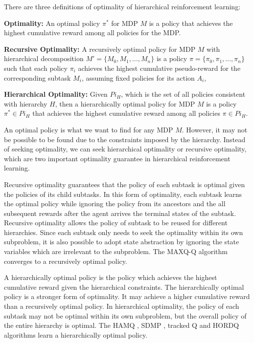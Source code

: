 There are three definitions of optimality of hierarchical reinforcement learning:

\begin{definition}
    \textbf{Optimality:} An optimal policy $\pi^*$ for MDP $M$ is a policy that achieves the highest cumulative reward
    among all policies for the MDP.
\end{definition}
\begin{definition}
    \textbf{Recursive Optimality:} A recursively optimal policy for MDP $M$ with hierarchical 
    decomposition $M' = \{M_0, M_1, \dots, M_n\}$ is a policy $\pi = \{\pi_0, \pi_1, \dots, \pi_n\}$ such
    that each policy $\pi_i$ achieves the highest cumulative pseudo-reward for the corresponding subtask $M_i$,
    assuming fixed policies for its action $A_i$, 
\end{definition}
\begin{definition}
    \textbf{Hierarchical Optimality:} Given $Pi_H$, which is the set of all policies consistent with hierarchy $H$, 
    then a hierarchically optimal policy for MDP $M$ is a policy $\pi^* \in Pi_H$ that achieves the highest cumulative reward
    among all policies $\pi \in Pi_H$.
\end{definition}

An optimal policy is what we want to find for any MDP $M$. However, it may not be possible to 
be found due to the constraints imposed by the hierarchy. Instead of seeking optimality, 
we can seek hierarchical optimality or recursive optimality, which are two important 
optimality guarantee in hierarchical reinforcement learning.

Recursive optimality guarantees that the policy of each subtask is optimal given the policies of its child subtasks.
In this form of optimality, each subtask learns the optimal policy while ignoring the policy from its ancestors
and the all subsequent rewards after the agent arrives the terminal states of the subtask.
Recursive optimality allows the policy of subtask to be reused for different hierarchies. Since
each subtask only needs to seek the optimality within its own subproblem, it is also possible
to adopt state abstraction by ignoring the state variables which are irrelevant
to the subproblem. The MAXQ-Q \cite{MaxQJ} algorithm converges to a recursively optimal policy. 

A hierarchically optimal policy is the policy which achieves the highest cumulative reward given the
hierarchical constraints. The hierarchically optimal policy is a stronger form of optimality. It
may achieve a higher cumulative reward than a recursively optimal policy. In hierarchical optimality, 
the policy of each subtask may not be optimal within its own subproblem, but the overall policy 
of the entire hierarchy is optimal. The HAMQ \cite{HAMQ}, SDMP \cite{SMDP}, tracked Q and HORDQ \cite{HORDQ} algorithms learn
a hierarchically optimal policy.

